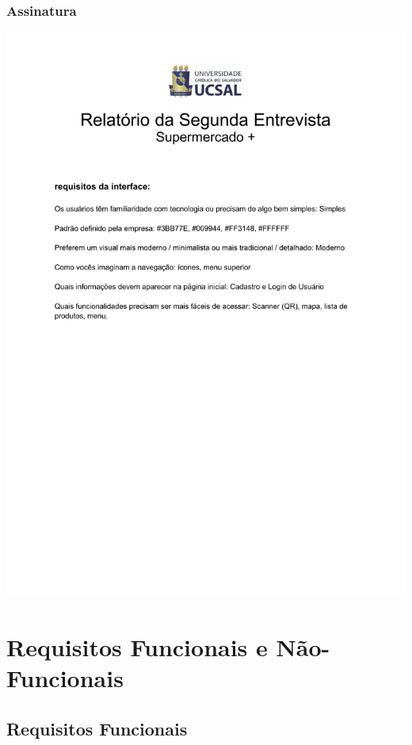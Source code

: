 \documentclass[12pt,oneside,a4paper,article]{abntex2}
\begin{document}
    \subsubsection{Assinatura}
    \includegraphics[page=3, width=\textwidth]{imagens-template/arquivos/segunda entrevista.pdf}
    \vspace{12mm}
    
    \section {Requisitos Funcionais e Não-Funcionais}   
    \vspace{12mm}                                       
    \subsection{Requisitos Funcionais}
    
\end{document}
